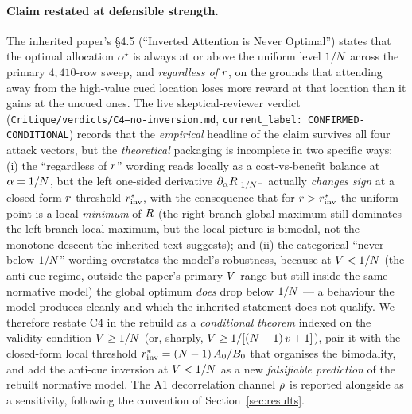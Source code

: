 \paragraph{Claim restated at defensible strength.}
The inherited paper's §4.5 (``Inverted Attention is Never Optimal'')
states that the optimal allocation $\alpha^\star$ is always at or
above the uniform level $1/N$ across the primary $4{,}410$-row
sweep, and \emph{regardless of $r$}, on the grounds that
attending away from the high-value cued location loses more reward at
that location than it gains at the uncued ones. The live
skeptical-reviewer verdict
(\texttt{Critique/verdicts/C4--no-inversion.md},
\texttt{current\_label: CONFIRMED-CONDITIONAL}) records that the
\emph{empirical} headline of the claim survives all four attack
vectors, but the \emph{theoretical} packaging is incomplete in two
specific ways: (i) the ``regardless of $r$'' wording reads
locally as a cost-vs-benefit balance at $\alpha = 1/N$, but the
left one-sided derivative $\partial_\alpha R |_{1/N^-}$
actually \emph{changes sign} at a closed-form $r$-threshold
$r^{*}_{\mathrm{inv}}$, with the consequence that for $r > r^{*}_{\mathrm{inv}}$ the
uniform point is a local \emph{minimum} of $R$ (the right-branch
global maximum still dominates the left-branch local maximum, but
the local picture is bimodal, not the monotone descent the inherited
text suggests); and (ii) the categorical ``never below $1/N$''
wording overstates the model's robustness, because at $V <
1/N$ (the anti-cue regime, outside the paper's primary $V$
range but still inside the same normative model) the global optimum
\emph{does} drop below $1/N$ --- a behaviour the model produces
cleanly and which the inherited statement does not qualify. We
therefore restate C4 in the rebuild as a \emph{conditional theorem}
indexed on the validity condition $V \ge 1/N$ (or, sharply,
$V \ge 1/[(N - 1)\,v + 1]$), pair it with the closed-form
local threshold $r^{*}_{\mathrm{inv}} = (N - 1)\,A_0/B_0$ that organises the
bimodality, and add the anti-cue inversion at $V < 1/N$ as a
new \emph{falsifiable prediction} of the rebuilt normative model.
The A1 decorrelation channel $\rho$ is reported alongside as a
sensitivity, following the convention of Section~\ref{sec:results}.

